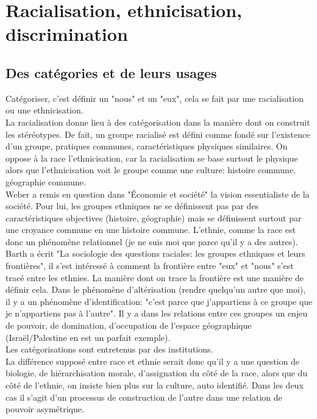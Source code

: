 \documentclass[10pt, a4paper, openany]{book}
\begin{document}
\section{Racialisation, ethnicisation, discrimination}

\subsection{Des catégories et de leurs usages}

Catégoriser, c'est définir un "nous" et un "eux", cela se fait par une racialisation ou une ethnicisation. \\
La racialisation donne lieu à des catégorisation dans la manière dont on construit les stéréotypes. De fait, un groupe racialisé est défini comme fondé sur l'existence d'un groupe, pratiques communes, caractéristiques physiques similaires. On oppose à la race l'ethnicisation, car la racialisation se base surtout le physique alors que l'ethnicisation voit le groupe comme une culture: histoire commune, géographie commune. \\
Weber a remis en question dans "Économie et société" la vision essentialiste de la société. Pour lui, les groupes ethniques ne se définissent pas par des caractéristiques objectives (histoire, géographie) mais se définissent surtout par une croyance commune en une histoire commune. L'ethnie, comme la race est donc un phénomène relationnel (je ne suis moi que parce qu'il y a des  autres). \\
Barth a écrit "La sociologie des questions raciales: les groupes ethniques et leurs frontières", il s'est intéressé à comment la frontière entre "eux" et "nous" s'est tracé entre les ethnies. La manière dont on trace la frontière est une manière de définir cela. Dans le phénomène d'altérisation (rendre quelqu'un autre que moi), il y a un phénomène d'identification: "c'est parce que j'appartiens à ce groupe que je n'appartiens pas à l'autre". Il y a dans les relations entre ces groupes un enjeu de pouvoir, de domination, d'occupation de l'espace géographique (Israël/Palestine en est un parfait exemple). \\
Les catégorisations sont entretenus par des institutions. \\
La différence supposé entre race et ethnie serait donc qu'il y a une question de biologie, de hiérarchisation morale, d'assignation du côté de la race, alors que du côté de l'ethnie, on insiste bien plus sur la culture, auto identifié. Dans les deux cas il s'agit d'un processus de construction de l'autre dans une relation de pouvoir asymétrique. 
\end{document}
